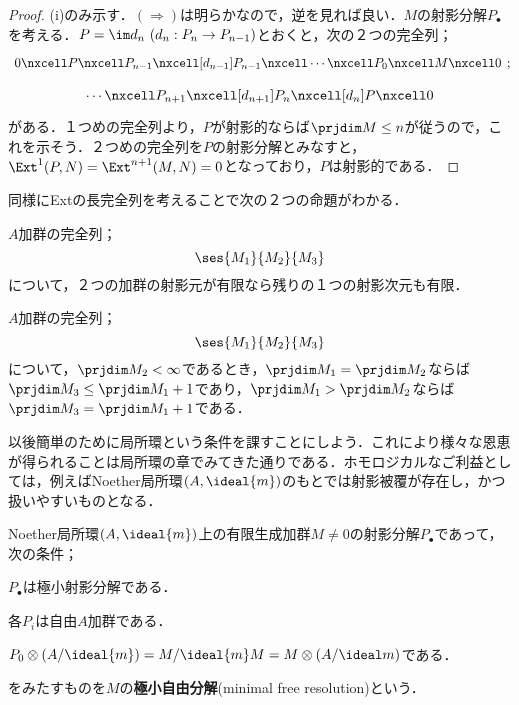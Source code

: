 \begin{proof}
	(i)のみ示す．$(\Longrightarrow)$は明らかなので，逆を見れば良い．$M$の射影分解$P_\bullet$を考える．$P=\im d_n~(d_n:P_n\to P_{n-1})$とおくと，次の２つの完全列；
	\[\begin{tikzcd}
	0\nxcell P\nxcell P_{n-1}\nxcell[d_{n-1}]P_{n-1}\nxcell\cdots\nxcell P_0\nxcell M\nxcell0\end{tikzcd};\]
	\[\begin{tikzcd}
	\cdots\nxcell P_{n+1}\nxcell[d_{n+1}]P_n\nxcell[d_n]P\nxcell0
	\end{tikzcd}\]
	がある．１つめの完全列より，$P$が射影的ならば$\prjdim M\leq n$が従うので，これを示そう．２つめの完全列を$P$の射影分解とみなすと，$\Ext^1(P,N)=\Ext^{n+1}(M,N)=0$となっており，$P$は射影的である．
\end{proof}

同様にExtの長完全列を考えることで次の２つの命題がわかる．
\begin{cor}
	$A$加群の完全列；
	\[\ses{M_1}{M_2}{M_3}\]
	について，２つの加群の射影元が有限なら残りの１つの射影次元も有限．
\end{cor}

\begin{cor}
	$A$加群の完全列；
	\[\ses{M_1}{M_2}{M_3}\]
	について，$\prjdim M_2<\infty$であるとき，$\prjdim M_1=\prjdim M_2$ならば$\prjdim M_3\leq\prjdim M_1+1$であり，$\prjdim M_1>\prjdim M_2$ならば$\prjdim M_3=\prjdim M_1+1$である．
\end{cor}

以後簡単のために局所環という条件を課すことにしよう．これにより様々な恩恵が得られることは局所環の章でみてきた通りである．ホモロジカルなご利益としては，例えばNoether局所環$(A,\ideal{m})$のもとでは射影被覆が存在し，かつ扱いやすいものとなる．

\begin{defi}[極小自由分解]
	Noether局所環$(A,\ideal{m})$上の有限生成加群$M\neq0$の射影分解$P_\bullet$であって，次の条件；
	\begin{sakura}
		\item $P_\bullet$は極小射影分解である．
		\item 各$P_i$は自由$A$加群である．
		\item $P_0\otimes(A/\ideal{m})=M/\ideal{m}M=M\otimes(A/\ideal m)$である．
	\end{sakura}
	をみたすものを$M$の\textbf{極小自由分解}(minimal free resolution)という．
\end{defi}

